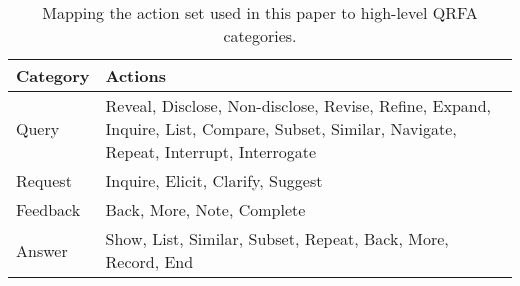 \begin{table}[t]
	\caption{Mapping the action set used in this paper to high-level QRFA categories.}
	\captionshrink
	\small
	\begin{tabular}{@{~}lp{6.7cm}}
	\toprule
	\textbf{Category} & \textbf{Actions} \\
	\midrule
	Query & Reveal, Disclose, Non-disclose, Revise, Refine, Expand, Inquire, List, Compare, Subset, Similar, Navigate, Repeat, Interrupt, Interrogate \\
	Request & Inquire, Elicit, Clarify, Suggest \\
	Feedback & Back, More, Note, Complete \\
	Answer & Show, List, Similar, Subset, Repeat, Back, More, Record, End \\
	\bottomrule
	\end{tabular}
\label{tbl:actions_qrfa}
\end{table}
